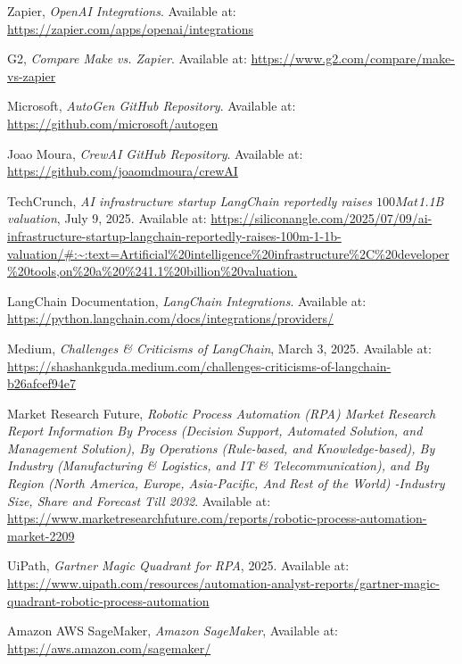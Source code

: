 \documentclass[11pt, a4paper, oneside]{article}
\begin{document}
\begin{thebibliography}{99}
    Zapier, \textit{OpenAI Integrations}.
    Available at: \url{https://zapier.com/apps/openai/integrations}

    G2, \textit{Compare Make vs. Zapier}.
    Available at: \url{https://www.g2.com/compare/make-vs-zapier}

    Microsoft, \textit{AutoGen GitHub Repository}.
    Available at: \url{https://github.com/microsoft/autogen}

    Joao Moura, \textit{CrewAI GitHub Repository}.
    Available at: \url{https://github.com/joaomdmoura/crewAI}

    TechCrunch, \textit{AI infrastructure startup LangChain reportedly raises $100M at $1.1B valuation}, July 9, 2025. Available at: \url{https://siliconangle.com/2025/07/09/ai-infrastructure-startup-langchain-reportedly-raises-100m-1-1b-valuation/#:~:text=Artificial%20intelligence%20infrastructure%2C%20developer%20tools,on%20a%20%241.1%20billion%20valuation.}

    LangChain Documentation, \textit{LangChain Integrations}.
    Available at: \url{https://python.langchain.com/docs/integrations/providers/}

    Medium, \textit{Challenges \& Criticisms of LangChain}, March 3, 2025. Available at: \url{https://shashankguda.medium.com/challenges-criticisms-of-langchain-b26afcef94e7}

    Market Research Future, \textit{Robotic Process Automation (RPA) Market Research Report Information By Process (Decision Support, Automated Solution, and Management Solution), By Operations (Rule-based, and Knowledge-based), By Industry (Manufacturing \& Logistics, and IT \& Telecommunication), and By Region (North America, Europe, Asia-Pacific, And Rest of the World) -Industry Size, Share and Forecast Till 2032}.
    Available at: \url{https://www.marketresearchfuture.com/reports/robotic-process-automation-market-2209}

    UiPath, \textit{Gartner Magic Quadrant for RPA}, 2025. Available at:
    \url{https://www.uipath.com/resources/automation-analyst-reports/gartner-magic-quadrant-robotic-process-automation}

    Amazon AWS SageMaker, \textit{Amazon SageMaker}, Available at: \url{https://aws.amazon.com/sagemaker/}


\end{thebibliography}
\end{document}
